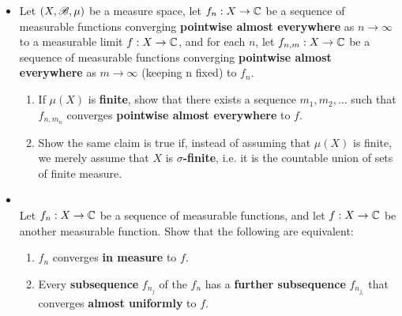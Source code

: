\documentclass[11pt]{article}
\begin{document}
\begin{itemize}
\item \begin{exercise} \citep{tao2011introduction}
Let $(X, {\mathscr B}, \mu)$ be a measure space, let $f_n : X \rightarrow {\mathbb C}$ be a sequence of measurable functions converging \textbf{pointwise almost
everywhere} as $n \rightarrow \infty$ to a measurable limit $f : X \rightarrow {\mathbb C}$, and for each $n$, let $f_{n,m} : X \rightarrow {\mathbb C}$ be a sequence of measurable functions converging \textbf{pointwise almost everywhere} as $m \rightarrow \infty$ (keeping n fixed) to $f_n$.
\begin{enumerate}
\item  If $\mu(X)$ is \textbf{finite}, show that there exists a sequence $m_1,  m_2, \ldots$ such that $f_{n, m_n}$ converges \textbf{pointwise almost everywhere} to $f$.
\item  Show the same claim is true if, instead of assuming that $\mu(X)$ is finite, we merely assume that $X$ is \textbf{$\sigma$-finite}, i.e. it is
the countable union of sets of finite measure.
\end{enumerate}
\end{exercise}

\item \begin{exercise} \citep{tao2011introduction}\\
Let $f_n : X \rightarrow {\mathbb C}$ be a sequence of measurable functions, and let $f : X \rightarrow {\mathbb C}$ be another measurable function. Show that
the following are equivalent:
\begin{enumerate}
\item $f_n$ converges \textbf{in measure} to $f$.
\item Every \textbf{subsequence} $f_{n_j}$ of the $f_n$ has a \textbf{further subsequence} $f_{n_{j_i}}$ that converges \textbf{almost uniformly} to $f$.
\end{enumerate}
\end{exercise}
\end{itemize}
\end{document}
